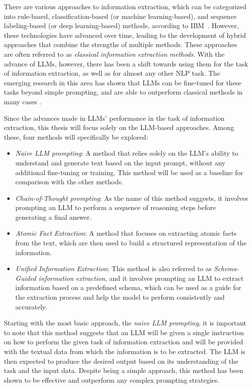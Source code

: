 There are various approaches to information extraction, which can be categorized into rule-based, classification-based (or machine learning-based), and sequence labeling-based (or deep learning-based) methods, according to IBM~\cite{WhatInformationExtraction2025}. However, these technologies have advanced over time, leading to the development of hybrid approaches that combine the strengths of multiple methods. These approaches are often referred to as \textit{classical information extraction methods}. With the advance of LLMs, however, there has been a shift towards using them for the task of information extraction, as well as for almost any other NLP task. The emerging research in this area has shown that LLMs can be fine-tuned for these tasks beyond simple prompting, and are able to outperform classical methods in many cases \cite{patelLargeLanguageModels2025, kasterComparisonRuleLarge2025,kallsteniusComparingTraditionalNatural2025}.

Since the advances made in LLMs' performance in the task of information extraction, this thesis will focus solely on the LLM-based approaches. Among these, four methods will specifically be explored: 
\begin{itemize}
    \item \textit{Naive LLM prompting}: A method that relies solely on the LLM's ability to understand and generate text based on the input prompt, without any additional fine-tuning or training. This method will be used as a baseline for comparison with the other methods.
    \item \textit{Chain-of-Thought prompting}: As the name of this method suggests, it involves prompting an LLM to perform a sequence of reasoning steps before generating a final answer.
    \item \textit{Atomic Fact Extraction}: A method that focuses on extracting atomic facts from the text, which are then used to build a structured representation of the information.
    \item \textit{Unified Information Extraction}: This method is also referred to as \textit{Schema-Guided information extraction}, and it involves prompting an LLM to extract information based on a predefined schema, which can be used as a guide for the extraction process and help the model to perform consistently and accurately.
\end{itemize}

Starting with the most basic approach, the \textit{naive LLM prompting}, it is important to note that this method suggests that an LLM will be given a single instruction on how to perform the given task of information extraction and will be provided with the textual data from which the information is to be extracted. The LLM is then expected to produce the desired output based on its understanding of the task and the input data. Despite being a simple approach, this method has been shown to be effective and outperform any complex prompting strategies\cite{hanInformationExtractionSolved2023, liRevisitingLargeLanguage2023}. 


